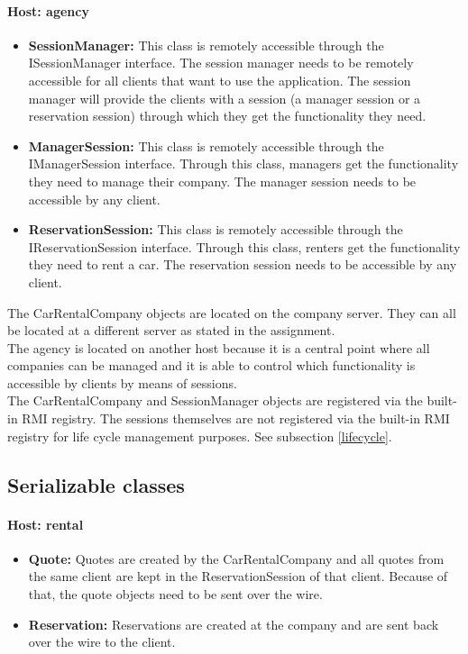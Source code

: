 \documentclass[10pt,a4paper]{article}
\begin{document}
\paragraph{Host: agency}
\begin{itemize}
\item \textbf{SessionManager:} This class is remotely accessible through the ISessionManager interface. The session manager needs to be remotely accessible for all clients that want to use the application. The session manager will provide the clients with a session (a manager session or a reservation session) through which they get the functionality they need.
\item \textbf{ManagerSession:} This class is remotely accessible through the IManagerSession interface. Through this class, managers get the functionality they need to manage their company. The manager session needs to be accessible by any client.
\item \textbf{ReservationSession:} This class is remotely accessible through the IReservationSession interface. Through this class, renters get the functionality they need to rent a car. The reservation session needs to be accessible by any client.
\end{itemize}

The CarRentalCompany objects are located on the company server. They can all be located at a different server as stated in the assignment.\\
The agency is located on another host because it is a central point where all companies can be managed and  it is able to control which functionality is accessible by clients by means of sessions.\\

The CarRentalCompany and SessionManager objects are registered via the built-in RMI registry. The sessions themselves are not registered via the built-in RMI registry for life cycle management purposes. See subsection \ref{lifecycle}.

\subsection{Serializable classes}

\paragraph{Host: rental}
\begin{itemize}
\item \textbf{Quote:} Quotes are created by the CarRentalCompany and all quotes from the same client are kept in the ReservationSession of that client. Because of that, the quote objects need to be sent over the wire.
\item \textbf{Reservation:} Reservations are created at the company and are sent back over the wire to the client. 
\end{itemize}
\end{document}
